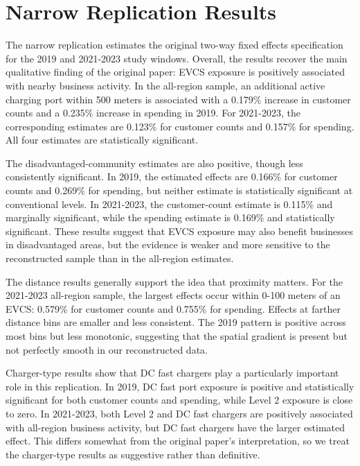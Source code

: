 \documentclass[12pt]{article}
\begin{document}

\section{Narrow Replication Results}

The narrow replication estimates the original two-way fixed effects specification for the 2019 and 2021-2023 study windows. Overall, the results recover the main qualitative finding of the original paper: EVCS exposure is positively associated with nearby business activity. In the all-region sample, an additional active charging port within 500 meters is associated with a 0.179\% increase in customer counts and a 0.235\% increase in spending in 2019. For 2021-2023, the corresponding estimates are 0.123\% for customer counts and 0.157\% for spending. All four estimates are statistically significant.

The disadvantaged-community estimates are also positive, though less consistently significant. In 2019, the estimated effects are 0.166\% for customer counts and 0.269\% for spending, but neither estimate is statistically significant at conventional levels. In 2021-2023, the customer-count estimate is 0.115\% and marginally significant, while the spending estimate is 0.169\% and statistically significant. These results suggest that EVCS exposure may also benefit businesses in disadvantaged areas, but the evidence is weaker and more sensitive to the reconstructed sample than in the all-region estimates.

The distance results generally support the idea that proximity matters. For the 2021-2023 all-region sample, the largest effects occur within 0-100 meters of an EVCS: 0.579\% for customer counts and 0.755\% for spending. Effects at farther distance bins are smaller and less consistent. The 2019 pattern is positive across most bins but less monotonic, suggesting that the spatial gradient is present but not perfectly smooth in our reconstructed data.

Charger-type results show that DC fast chargers play a particularly important role in this replication. In 2019, DC fast port exposure is positive and statistically significant for both customer counts and spending, while Level 2 exposure is close to zero. In 2021-2023, both Level 2 and DC fast chargers are positively associated with all-region business activity, but DC fast chargers have the larger estimated effect. This differs somewhat from the original paper’s interpretation, so we treat the charger-type results as suggestive rather than definitive.
\end{document}
